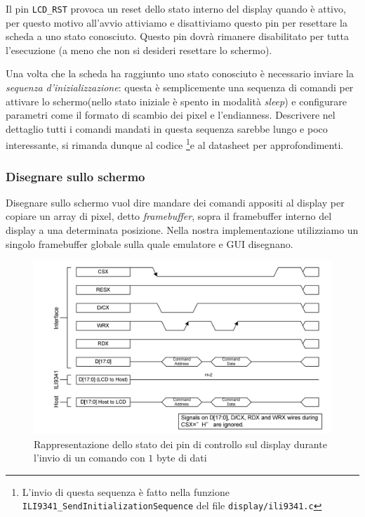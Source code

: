 \documentclass[hidelinks,12pt]{article}
\begin{document}
Il pin \texttt{LCD\_RST} provoca un reset dello stato interno del display quando
è attivo, per questo motivo all'avvio attiviamo e disattiviamo questo pin per
resettare la scheda a uno stato conosciuto.
Questo pin dovrà rimanere disabilitato per tutta l'esecuzione
(a meno che non si desideri resettare lo schermo).

Una volta che la scheda ha raggiunto uno stato conosciuto è necessario inviare
la \textit{sequenza d'inizializzazione}: questa è semplicemente una sequenza
di comandi per attivare lo schermo(nello stato iniziale è spento in
modalità \textit{sleep}) e configurare parametri come il formato di scambio
dei pixel e l'endianness.
Descrivere nel dettaglio tutti i comandi mandati in questa sequenza sarebbe
lungo e poco interessante, si rimanda dunque al codice \footnote{
	L'invio di questa sequenza è fatto nella funzione
	\texttt{ILI9341\_SendInitializationSequence} del file
	\texttt{display/ili9341.c}
}e al datasheet \cite{ili9341} per approfondimenti.

\subsubsection{Disegnare sullo schermo}
Disegnare sullo schermo vuol dire mandare dei comandi appositi al display per
copiare un array di pixel, detto \textit{framebuffer}, sopra il framebuffer
interno del display a una determinata posizione.
Nella nostra implementazione utilizziamo un singolo framebuffer globale sulla
quale emulatore e GUI disegnano.

\begin{figure}[h]
	\centering
	\includegraphics[scale=0.8]{figures/wr_cycle.png}
	\caption{
		Rappresentazione dello stato dei pin di controllo sul display durante
		l'invio di un comando con $1$ byte di dati
	}
	\label{fig:ili_wr_cycle}
\end{figure}
\end{document}
